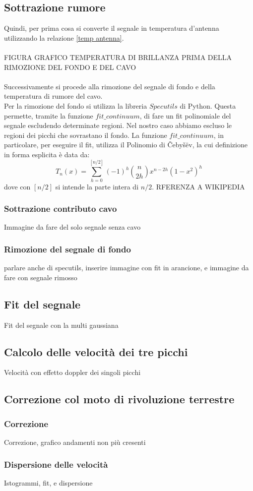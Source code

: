 \subsection{Sottrazione rumore}
Quindi, per prima cosa si converte il segnale in temperatura d'antenna utilizzando la relazione \eqref{temp antenna}.\\\\
FIGURA GRAFICO TEMPERATURA DI BRILLANZA PRIMA DELLA RIMOZIONE DEL FONDO E DEL CAVO\\\\
Successivamente si procede alla rimozione del segnale di fondo e della temperatura di rumore del cavo.\\
Per la rimozione del fondo si utilizza la libreria $Specutils$ di Python. Questa permette, tramite la funzione $fit\_continuum$, di fare un fit polinomiale del segnale escludendo determinate regioni. Nel nostro caso abbiamo escluso le regioni dei picchi che sovrastano il fondo. La funzione $fit\_continuum$, in particolare, per eseguire il fit, utilizza il Polinomio di Čebyšëv, la cui definizione in forma esplicita è data da:
\begin{equation}
    T_n(x)=\sum_{h=0}^{[n/2]} (-1)^h {n \choose 2h} x^{n-2h} (1-x^2)^h
\end{equation}
dove con $[n/2]$ si intende la parte intera di $n/2$. RFERENZA A WIKIPEDIA

\subsubsection{Sottrazione contributo cavo}
Immagine da fare del solo segnale senza cavo




\subsubsection{Rimozione del segnale di fondo}
parlare anche di specutils, inserire immagine con fit in arancione, e immagine da fare con segnale rimosso


\subsection{Fit del segnale}
Fit del segnale con la multi gaussiana

\subsection{Calcolo delle velocità dei tre picchi}
Velocità con effetto doppler dei singoli picchi

\subsection{Correzione col moto di rivoluzione terrestre}

\subsubsection{Correzione}
Correzione, grafico andamenti non più cresenti 


\subsubsection{Dispersione delle velocità}
Istogrammi, fit, e dispersione
